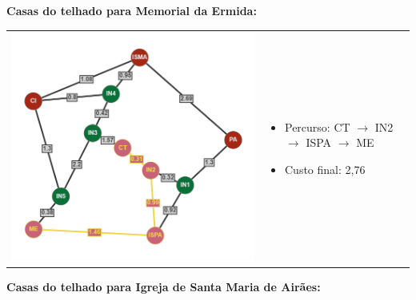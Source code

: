 \documentclass[12pt]{article}
\begin{document}
    \noindent \textbf{Casas do telhado para Memorial da Ermida:}\\
    \begin{tabular}{@{}m{}m{}@{}}
      \centering\includegraphics[scale=0.4]{anexos/CT-ME.png} &
      \begin{itemize}
        \item  Percurso: CT $\rightarrow$ IN2 $\rightarrow$ ISPA $\rightarrow$ ME
        \item  Custo final: 2,76
      \end{itemize}
    \end{tabular}
    \newpage
   \noindent\textbf{ Casas do telhado para Igreja de Santa Maria de Airães:}\\
\end{document}
